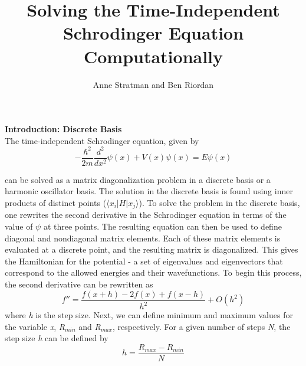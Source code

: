 \documentclass[%
 reprint,
 amsmath,amssymb,
 aps,
]{revtex4-1}
\begin{document}



\title{Solving the Time-Independent Schrodinger Equation Computationally}

\author{Anne Stratman and Ben Riordan}
%

\maketitle								%





\noindent \textbf{Introduction: Discrete Basis}\\

\noindent The time-independent Schrodinger equation, given by
\begin{equation}
-\frac{\hbar^2}{2m}\frac{d^2}{dx^2}\psi(x)+V(x)\psi(x)=E\psi(x)
\end{equation}

\noindent can be solved as a matrix diagonalization problem in a discrete basis or a harmonic oscillator basis.  The solution in the discrete basis is found using inner products of distinct points ($\langle x_i|H|x_j\rangle$).  To solve the problem in the discrete basis, one rewrites the second derivative in the Schrodinger equation in terms of the value of $\psi$ at three points.  The resulting equation can then be used to define diagonal and nondiagonal matrix elements.  Each of these matrix elements is evaluated at a discrete point, and the resulting matrix is diagonalized.  This gives the Hamiltonian for the potential - a set of eigenvalues and eigenvectors that correspond to the allowed energies and their wavefunctions.  To begin this process, the second derivative can be rewritten as
\begin{equation}
f''=\frac{f(x+h)-2f(x)+f(x-h)}{h^2}+O(h^2)
\end{equation}
\noindent where \textit{h} is the step size.  Next, we can define minimum and maximum values for the variable \textit{x}, \textit{R}$_{min}$ and \textit{R}$_{max}$, respectively.  For a given number of steps \textit{N}, the step size \textit{h} can be defined by
\begin{equation}
h=\frac{R_{max}-R_{min}}{N}
\end{equation}
\end{document}
